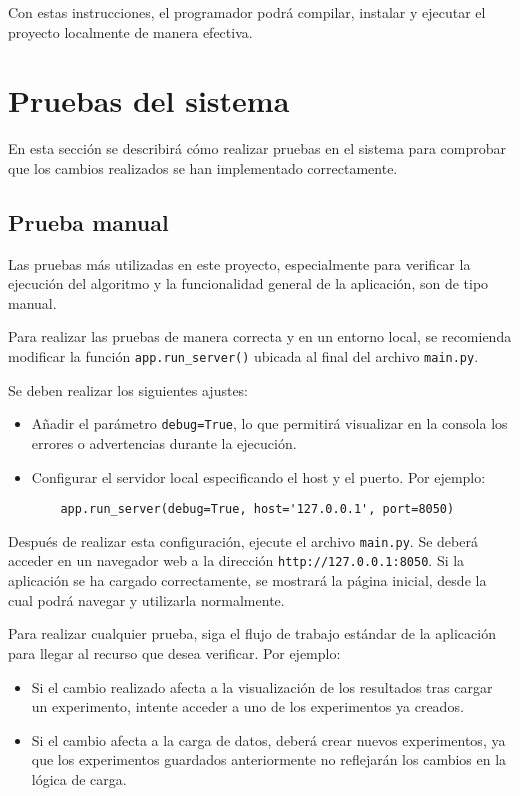 Con estas instrucciones, el programador podrá compilar, instalar y ejecutar el proyecto localmente de manera efectiva.

\section{Pruebas del sistema}

En esta sección se describirá cómo realizar pruebas en el sistema para comprobar que los cambios realizados se han implementado correctamente.

\subsection{Prueba manual}

Las pruebas más utilizadas en este proyecto, especialmente para verificar la ejecución del algoritmo y la funcionalidad general de la aplicación, son de tipo manual.

Para realizar las pruebas de manera correcta y en un entorno local, se recomienda modificar la función \texttt{app.run\_server()} ubicada al final del archivo \texttt{main.py}. 

Se deben realizar los siguientes ajustes:
\begin{itemize}
    \item Añadir el parámetro \texttt{debug=True}, lo que permitirá visualizar en la consola los errores o advertencias durante la ejecución.
    \item Configurar el servidor local especificando el host y el puerto. Por ejemplo:
    \begin{verbatim}
    app.run_server(debug=True, host='127.0.0.1', port=8050)
    \end{verbatim}
\end{itemize}

Después de realizar esta configuración, ejecute el archivo \texttt{main.py}. Se deberá acceder en un navegador web a la dirección \texttt{http://127.0.0.1:8050}. Si la aplicación se ha cargado correctamente, se mostrará la página inicial, desde la cual podrá navegar y utilizarla normalmente.

Para realizar cualquier prueba, siga el flujo de trabajo estándar de la aplicación para llegar al recurso que desea verificar. Por ejemplo:
\begin{itemize}
    \item Si el cambio realizado afecta a la visualización de los resultados tras cargar un experimento, intente acceder a uno de los experimentos ya creados. 
    \item Si el cambio afecta a la carga de datos, deberá crear nuevos experimentos, ya que los experimentos guardados anteriormente no reflejarán los cambios en la lógica de carga.
\end{itemize}

